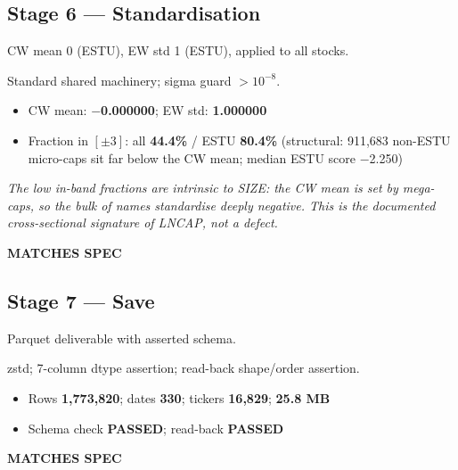 \documentclass[11pt,a4paper]{article}
\newcommand{\PASS}[1]{\textcolor{pass}{\textbf{#1}}}
\newcommand{\NOTE}[1]{\textcolor{note}{\textit{#1}}}
\begin{document}
\subsection{Stage 6 --- Standardisation}

\begin{description}[style=nextline]
  \item[PDF SPEC] CW mean 0 (ESTU), EW std 1 (ESTU), applied to all stocks.
  \item[Implementation] Standard shared machinery; sigma guard $>10^{-8}$.
  \item[Observed]\phantom{x}
    \begin{itemize}[nosep, topsep=-\parskip]
      \item CW mean: \textbf{$-$0.000000}; EW std: \textbf{1.000000}
      \item Fraction in $[\pm3]$: all \textbf{44.4\%} / ESTU \textbf{80.4\%} (structural: 911{,}683 non-ESTU micro-caps sit far below the CW mean; median ESTU score $-$2.250)
    \end{itemize}
  \item[Deviation] \NOTE{The low in-band fractions are intrinsic to SIZE: the CW mean is set by mega-caps, so the bulk of names standardise deeply negative. This is the documented cross-sectional signature of LNCAP, not a defect.}
  \item[Status] \PASS{MATCHES SPEC}
\end{description}

\subsection{Stage 7 --- Save}

\begin{description}[style=nextline]
  \item[PDF SPEC] Parquet deliverable with asserted schema.
  \item[Implementation] zstd; 7-column dtype assertion; read-back shape/order assertion.
  \item[Observed]\phantom{x}
    \begin{itemize}[nosep, topsep=-\parskip]
      \item Rows \textbf{1{,}773{,}820}; dates \textbf{330}; tickers \textbf{16{,}829}; \textbf{25.8 MB}
      \item Schema check \PASS{PASSED}; read-back \PASS{PASSED}
    \end{itemize}
  \item[Status] \PASS{MATCHES SPEC}
\end{description}
\end{document}
